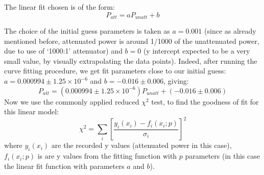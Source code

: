 The linear fit chosen is of the form: 
\begin{equation}
\label{eqn:linearfit1}
P_{att}=aP_{unatt}+b
\end{equation}

The choice of the initial guess parameters is taken as $a=0.001$ (since as already mentioned before, attenuated power is around 1/1000 of the unattenuated power, due to use of `1000:1' attenuator) and $b=0$ (y intercept expected to be a very small value, by visually extrapolating the data points). Indeed, after running the curve fitting procedure, we get fit parameters close to our initial guess: $a=0.000994\pm 1.25\times 10^{-6}$ and $b=-0.016\pm 0.006$, giving: $$P_{att}=(0.000994\pm 1.25\times 10^{-6})P_{unatt}+(-0.016\pm 0.006)$$
Now we use the commonly applied reduced $\chi^{2}$ test, to find the goodness of fit for this linear model: 
\begin{equation}
\chi^{2}=\sum_{i}\left[\dfrac{y_{i}(x_{i})-f_{i}(x_{i};p)}{\sigma_{i}}\right]^{2}
\end{equation}
where $y_{i}(x_{i})$ are the recorded y values (attenuated power in this case), $f_{i}(x_{i};p)$ is are y values from the fitting function with $p$ parameters (in this case the linear fit function with parameters $a$ and $b$).

